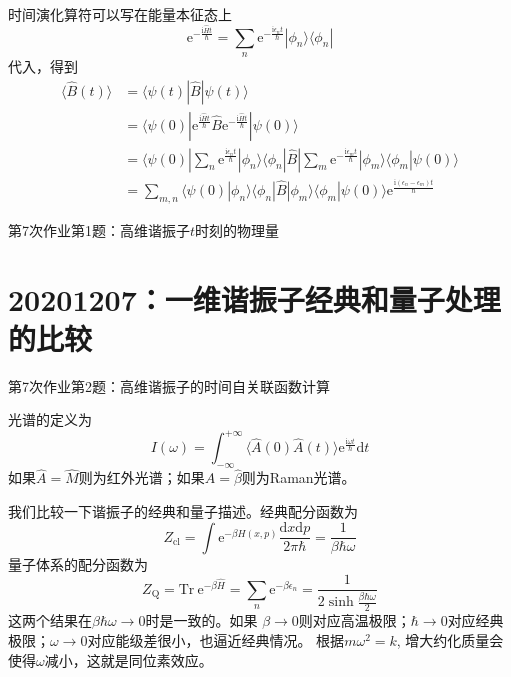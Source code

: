         时间演化算符可以写在能量本征态上
        \[ \mathrm{e}^{-\frac {\mathrm{i}\hat{H}t}{\hbar}} = \sum_n \mathrm{e}^{-\frac {\mathrm{i}\epsilon_n t}{\hbar}} |\phi_n \rangle \langle\phi_n| \]
        代入，得到 
        \begin{equation}\begin{aligned}
            \langle \hat{B}(t) \rangle &= \langle \psi(t)|\hat{B} | \psi(t) \rangle\\
            &= \langle \psi(0) |\mathrm{e}^{\frac {\mathrm{i}\hat{H}t}{\hbar}} \hat{B} \mathrm{e}^{-\frac {\mathrm{i}\hat{H}t}{\hbar}}|\psi(0) \rangle\\
            &= \langle \psi(0) |\sum_n \mathrm{e}^{\frac {\mathrm{i}\epsilon_n t}{\hbar}} |\phi_n \rangle \langle\phi_n|\hat{B}|\sum_m \mathrm{e}^{-\frac {\mathrm{i}\epsilon_m t}{\hbar}} |\phi_m \rangle \langle\phi_m|\psi(0)\rangle\\
            &= \sum_{m,n} \langle \psi(0)|\phi_n\rangle \langle \phi_n|\hat{B}|\phi_m \rangle \langle \phi_m|\psi(0)\rangle \mathrm{e}^{\frac {\mathrm{i}(\epsilon_n-\epsilon_m)t}{\hbar}}
        \end{aligned}\end{equation}
        \begin{asg}
            第7次作业第1题：高维谐振子$t$时刻的物理量
        \end{asg}

    \section{20201207：一维谐振子经典和量子处理的比较}
    \begin{asg}
        第7次作业第2题：高维谐振子的时间自关联函数计算
    \end{asg}

    光谱的定义为
    \[ I(\omega) = \int_{-\infty}^{+\infty} \langle \hat{A}(0)\hat{A}(t)\rangle \mathrm{e}^{\frac {\mathrm{i}\omega t}{\hbar}} \mathrm{d}t \]
    如果$\hat{A} = \hat{M}$则为红外光谱；如果$\hat{A} = \hat{\beta}$则为Raman光谱。

    我们比较一下谐振子的经典和量子描述。经典配分函数为
    \[ Z_\mathrm{cl} = \int \mathrm{e}^{-\beta H(x,p)}\frac {\mathrm{d}x\mathrm{d}p}{2\pi\hbar} = \frac 1{\beta\hbar\omega} \]
    量子体系的配分函数为
    \[ Z_\mathrm{Q} = \mathrm{Tr} \ \mathrm{e}^{-\beta \hat{H}} = \sum_n \mathrm{e}^{-\beta\epsilon_n} = \frac 1{2\sinh{\frac {\beta\hbar\omega}2}} \]
    这两个结果在$\beta\hbar\omega \to 0$时是一致的。如果
    $\beta \to 0$则对应高温极限；$\hbar \to 0$对应经典极限；$\omega \to 0$对应能级差很小，也逼近经典情况。
    根据$m\omega^2 = k$, 增大约化质量会使得$\omega$减小，这就是同位素效应。

